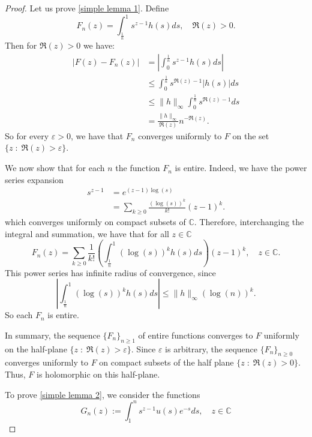     \begin{proof} 
        Let us prove \eqref{simple lemma 1}. Define
        $$F_n(z)=\int_{\frac1n}^1s^{z-1}h(s)ds,\quad\Re(z)>0.$$
        Then for $\Re(z) > 0$ we have:
        \begin{align*}
            |F(z)-F_n(z)| &= \left|\int_0^{\frac1n}s^{z-1}h(s)ds\right|\\
                          &\leq \int_0^{\frac1n}s^{\Re(z)-1}|h(s)|ds\\
                          &\leq \|h\|_{\infty}\int_0^{\frac1n}s^{\Re(z)-1}ds\\
                          &= \frac{\|h\|_{\infty}}{\Re(z)} n^{-\Re(z)}.
        \end{align*}
        So for every $\varepsilon > 0$, we have that $F_n$ converges uniformly to $F$ on the set $\{z\;:\; \Re(z) > \varepsilon\}$.

        We now show that for each $n$ the function $F_n$ is entire. 
        Indeed, we have the power series expansion
        \begin{align*}
            s^{z-1} &= e^{(z-1)\log(s)}\\
                    &= \sum_{k\geq0}\frac{(\log(s))^k}{k!}(z-1)^k.
        \end{align*}
        which converges uniformly on compact subsets of $\mathbb{C}$.
        Therefore, interchanging the integral and summation, we have that for all $z \in \mathbb{C}$
        \begin{equation}\label{fn taylor expansion}
            F_n(z) = \sum_{k\geq0}\frac1{k!}\left(\int_{\frac1n}^1(\log(s))^kh(s)ds\right)(z-1)^k,\quad z\in\mathbb{C}.
        \end{equation}
        This power series has infinite radius of convergence, since
        \begin{equation*}
            \left|\int_{\frac1n}^1(\log(s))^kh(s)ds\right| \leq \|h\|_{\infty}(\log(n))^k.
        \end{equation*}
        So each $F_n$ is entire.        

        In summary, the sequence $\{F_n\}_{n\geq1}$ of entire functions converges to $F$ uniformly on the half-plane $\{z\;:\; \Re(z) > \varepsilon\}$. Since $\varepsilon$ is arbitrary, the sequence
        $\{F_n\}_{n\geq 0}$ converges uniformly to $F$ on compact subsets of the half plane $\{z \;:\;\Re(z) > 0\}$. Thus, $F$ is holomorphic on this half-plane.

        To prove \eqref{simple lemma 2}, we consider the functions
        \begin{equation*}
            G_n(z) := \int_1^ns^{z-1}u(s)e^{-s}ds,\quad z\in\mathbb{C}
        \end{equation*}
        

\end{proof}
